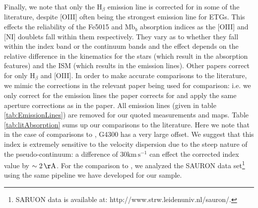 	Finally, we note that only the H$_\beta$ emission line is corrected for in some of the literature, despite [OIII] often being the strongest emission line for ETGs. This effects the reliability of the Fe5015 and Mb$_b$ absorption indices as the [OIII] and [NI] doublets fall within them respectively. They vary as to whether they fall within the index band or the continuum bands and the effect depends on the relative difference in the kinematics for the stars (which result in the absorption features) and the ISM (which results in the emission lines). Other papers correct for only H$_\beta$ and [OIII]. In order to make accurate comparisons to the literature, we mimic the corrections in the relevant paper being used for comparison: i.e. we only correct for the emission lines the paper corrects for and apply the same aperture corrections as in the paper. All emission lines (given in table \ref{tab:EmissionLines}) are removed for our quoted measurements and maps. Table \ref{tab:litAbsorption} sums up our comparisons to the literature. Here we note that in the case of comparisons to \citet{Rampazzo2005}, G4300 has a very large offset. We suggest that this index is extremely sensitive to the velocity dispersion due to the steep nature of the pseudo-continuum: a difference of $30 \mathrm{km \, s^{-1}}$ can effect the corrected index value by $\sim 2 \, \mathrm{\AA}$. For the comparison to \citet{Vazdekis2010}, we analyzed the SAURON data set\footnote{SARUON data is available at: http://www.strw.leidenuniv.nl/sauron/.} \citep{Emsellem2004} using the same pipeline we have developed for our sample. 

